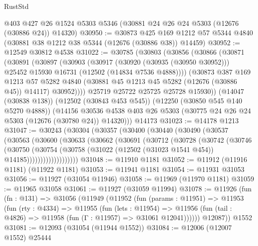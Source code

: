 \begin{lexlean}{RustStd}
\begin{coremodule}
    @403
    @427
    @26
    @1524
    @5303
    @5346
    (@30881 @24 @26 @24 @5303 (@12676 (@30886 @24)) @14320)
@30950 := @30873
    @425
    @169
    @1212
    @57
    @5344
    @4840
    (@30881 @38 @1212 @38 @5344 (@12676 (@30886 @38)) @14459)
@30952 := @12549 @30812 @4538
@31022 := @30785
    (@30803
      (@30856
        (@30866
          (@30871
            (@30891
              (@30897
                (@30903
                  (@30917
                    (@30920 (@30935 (@30950 @30952)))
                    @25452
                    @15930
                    @16731
                    (@12502 (@14834 @7536 @4888))))
                (@30873
                  @387
                  @169
                  @1213
                  @57
                  @5282
                  @4840
                  (@30881 @45 @1213 @45 @5282 (@12676 (@30886 @45)) @14117)
                  @30952))))
          @25719
          @25722
          @25725
          @25728
          @15930))
      (@14047 (@30838 @138))
      (@12502 (@30843 @453 @545))
      (@12250 (@30850 @545 @140 @5270 @4888))
      (@14156 @30536 @4538 @403 @26 @5303 (@30775 @24 @26 @24 @5303 (@12676 (@30780 @24)) @14320)))
    @14173
@31023 := @14178 @1213
@31047 := @30243
    (@30304
      (@30357
        (@30400
          (@30440
            (@30490
              (@30537
                (@30563
                  (@30600
                    (@30633
                      (@30662
                        (@30691
                          (@30712
                            (@30728
                              (@30742
                                (@30746
                                  (@30750
                                    (@30754
                                      (@30758
                                        (@31022
                                          (@12502 (@31023 @1541 @454))
                                          @14185)))))))))))))))))))
@31048 := @11910 @1181
@31052 := @11912 (@11916 @1181) (@11922 @1181)
@31053 := @11941 @1181
@31054 := @11931 @31053
@31056 := @11927 (@31054 @11946)
@31058 := @11969 (@11970 @1181)
@31059 := @11965 @31058
@31061 := @11927 (@31059 @11994)
@31078 := @11926
    (fun (fn : @131) =>
    @31056
      (@11949
        (@11952
          (fun (params : @11951) =>
          @11953
            (fun (rty : @4334) =>
            @11955
              (fun (lets : @11954) =>
              @11956 (fun (tail : @4826) => @11958 (fun (Γ : @11957) => @31061 @12041))))))
        @12087))
    @1552
@31081 := @12093 (@31054 (@11944 @1552))
@31084 := @12006 (@12007 @1552) @25444

\end{coremodule}
\end{lexlean}
